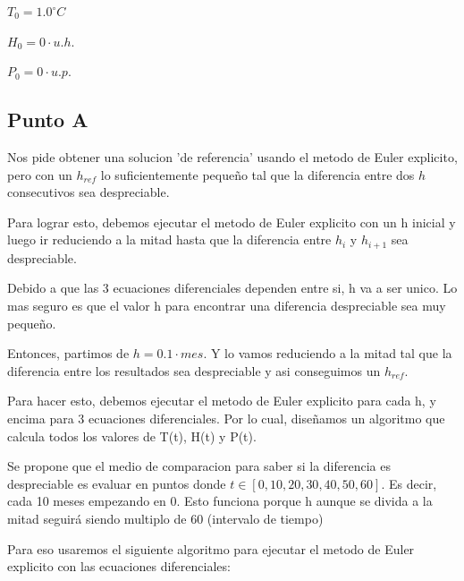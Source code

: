 $T_{0} = 1.0 ^\circ C$

$H_{0} = 0 \cdot u.h.$

$P_{0} = 0 \cdot u.p.$

\subsection{Punto A}

Nos pide obtener una solucion 'de referencia' usando el metodo de Euler explicito, pero con un $h_{ref}$ lo suficientemente pequeño tal que la diferencia entre dos $h$ consecutivos sea despreciable.

Para lograr esto, debemos ejecutar el metodo de Euler explicito con un h inicial y luego ir reduciendo a la mitad hasta que la diferencia entre $h_{i}$ y $h_{i+1}$ sea despreciable.

Debido a que las 3 ecuaciones diferenciales dependen entre si, h va a ser unico. Lo mas seguro es que el valor h para encontrar una diferencia despreciable sea muy pequeño.

Entonces, partimos de $h = 0.1 \cdot mes$. Y lo vamos reduciendo a la mitad tal que la diferencia entre los resultados sea despreciable y asi conseguimos un $h_{ref}$. 

Para hacer esto, debemos ejecutar el metodo de Euler explicito para cada h, y encima para 3 ecuaciones diferenciales. Por lo cual, diseñamos un algoritmo que calcula todos los valores de T(t), H(t) y P(t).

Se propone que el medio de comparacion para saber si la diferencia es despreciable es evaluar en puntos donde $t \in [0, 10, 20, 30, 40, 50, 60]$. Es decir, cada 10 meses empezando en 0. Esto funciona porque h aunque se divida a la mitad seguirá siendo multiplo de 60 (intervalo de tiempo)

Para eso usaremos el siguiente algoritmo para ejecutar el metodo de Euler explicito con las ecuaciones diferenciales:


